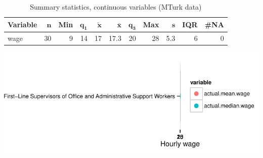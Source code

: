 \documentclass[a4paper,10pt]{article}\usepackage[]{graphicx}\usepackage[]{color}
\makeatletter
\def\maxwidth{ %
  \ifdim\Gin@nat@width>\linewidth
    \linewidth
  \else
    \Gin@nat@width
  \fi
}
\makeatother
\begin{document}
\begin{table}[ht]
\centering
{\footnotesize
\begin{tabular}{lrrrrrrrrrr}
 \textbf{Variable} & $\mathbf{n}$ & \textbf{Min} & $\mathbf{q_1}$ & $\mathbf{\widetilde{x}}$ & $\mathbf{\bar{x}}$ & $\mathbf{q_3}$ & \textbf{Max} & $\mathbf{s}$ & \textbf{IQR} & \textbf{\#NA} \\ 
  \hline
wage & 30 & 9 & 14 & 17 & 17.3 & 20 & 28 & 5.3 & 6 & 0 \\ 
  \end{tabular}
}
\caption{Summary statistics, continuous variables (MTurk data)} 
\label{tab2:43-1010}
\end{table}


{\centering \includegraphics[width=\maxwidth]{figure/unnamed-chunk-221} 

}
\end{document}
